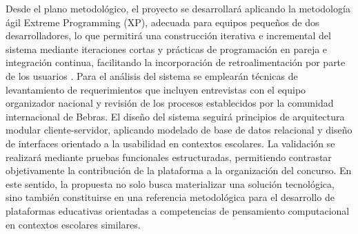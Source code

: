     Desde el plano metodológico, el proyecto se desarrollará aplicando la metodología ágil Extreme Programming (XP), adecuada para equipos pequeños de dos desarrolladores, lo que permitirá una construcción iterativa e incremental del sistema mediante iteraciones cortas y prácticas de programación en pareja e integración continua, facilitando la incorporación de retroalimentación por parte de los usuarios \cite{beckandres2004}. Para el análisis del sistema se emplearán técnicas de levantamiento de requerimientos que incluyen entrevistas con el equipo organizador nacional y revisión de los procesos establecidos por la comunidad internacional de Bebras. El diseño del sistema seguirá principios de arquitectura modular cliente-servidor, aplicando modelado de base de datos relacional y diseño de interfaces orientado a la usabilidad en contextos escolares. La validación se realizará mediante pruebas funcionales estructuradas, permitiendo contrastar objetivamente la contribución de la plataforma a la organización del concurso. En este sentido, la propuesta no solo busca materializar una solución tecnológica, sino también constituirse en una referencia metodológica para el desarrollo de
    plataformas educativas orientadas a competencias de pensamiento computacional en contextos escolares similares.
